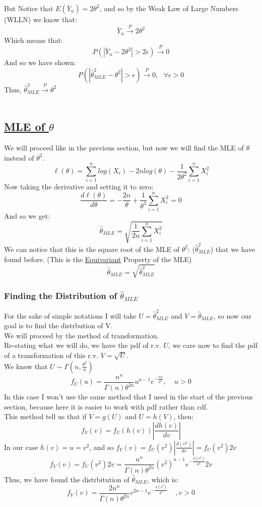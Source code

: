 \documentclass[12pt]{article}
\begin{document}
But Notice that $E(\bar{Y}_n) = 2\theta^2$, and so by the Weak Law of Large Numbers (WLLN) we know that:
\[
  \bar{Y}_n \xrightarrow{P} 2\theta^2
\]
Which means that:
\[
  P(|\bar{Y}_n - 2\theta^2| > 2\epsilon)  \xrightarrow{P} 0
\]
And so we have shown:
\[
  P(|\hat{\theta}^2_{MLE} - \theta^2| > \epsilon) \xrightarrow{P} 0, \ \ \ \forall \epsilon > 0
\]
Thus, $\hat{\theta}^2_{MLE} \xrightarrow{P}\theta^2$
\\ \\
\subsection*{\underline{MLE of $\theta$}}
We will proceed like in the previous section, but now we will find the MLE of $\theta$ instead of $\theta^2$. \\
\[
  \ell(\theta) = \sum_{i=1}^{n} log(X_i) - 2n log(\theta) - \frac{1}{2\theta^2} \sum_{i=1}^{n} X_i^2
\]
Now taking the derivative and setting it to zero:
\[
  \frac{d\ell(\theta)}{d\theta} = -\frac{2n}{\theta} + \frac{1}{\theta^3} \sum_{i=1}^{n} X_i^2 = 0
\]
And so we get:
\[
  \hat{\theta}_{MLE} = \sqrt{\frac{1}{2n} \sum_{i=1}^{n} X_i^2}
\]
We can notice that this is the square root of the MLE of $\theta^2$: ($\hat{\theta}^2_{MLE}$) that we have found before. (This is the \underline{Equivariant} Property of the MLE)
\[
  \hat{\theta}_{MLE} = \sqrt{\hat{\theta}^2_{MLE}}
\]
\subsubsection*{Finding the Distribution of $\hat{\theta}_{MLE}$}
For the sake of simple notations I will take $U=\hat{\theta}^2_{MLE}$ and $V=\hat{\theta}_{MLE}$, so now our goal is to find the distrbution of V. \\
We will proceed by the method of transformation. \\
Re-stating what we will do, we have the pdf of r.v. $U$, we care now to find the pdf of a transformation of this r.v. $V=\sqrt{U}$. \\
We know that $U \sim \Gamma(n,\frac{\theta^2}{n})$
\[
  f_U(u) = \frac{n^n}{\Gamma(n)\theta^{2n}}u^{n-1}e^{-\frac{nu}{\theta^2}}, \ \ \ \ \ u>0
\]
In this case I won't use the same method that I used in the start of the previous section, because here it is easier to work with pdf rather than cdf. \\
This method tell us that if $V=g(U)$ and $U=h(V)$, then:
\[
  f_V(v)= f_U(h(v))|\frac{dh(v)}{dv}|
\]
In our case $h(v)=u=v^2$, and so $f_V(v) = f_U(v^2)|\frac{d(v^2)}{dv}| = f_U(v^2)2v$
\[
  f_V(v) = f_U(v^2)2v = \frac{n^n}{\Gamma(n)\theta^{2n}}(v^2)^{n-1}e^{-\frac{n(v^2)}{\theta^2}}2v
\]
Thus, we have found the distrbitution of $\hat{\theta}_{MLE}$, which is:
\[
  f_V(v) = \frac{2n^n}{\Gamma(n)\theta^{2n}}v^{2n-1}e^{-\frac{n(v^2)}{\theta^2}} \ \ \ \ \ ,v>0
\]
\end{document}
